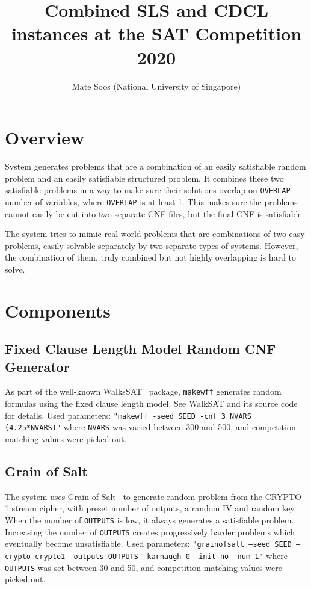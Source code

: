 \documentclass[final]{ieee}
\begin{document}
\title{Combined SLS and CDCL instances at the SAT Competition 2020}
\author{Mate Soos (National University of Singapore)}

\maketitle
\thispagestyle{empty}
\pagestyle{empty}



\section{Overview}
System generates problems that are a combination of an easily satisfiable random problem and an easily satisfiable structured problem. It combines these two satisfiable problems in a way to make sure their solutions overlap on \texttt{OVERLAP} number of variables, where \texttt{OVERLAP} is at least 1. This makes sure the problems cannot easily be cut into two separate CNF files, but the final CNF is satisfiable.

The system tries to mimic real-world problems that are combinations of two easy problems, easily solvable separately by two separate types of systems. However, the combination of them, truly combined but not highly overlapping is hard to solve.


\section{Components}


\subsection{Fixed Clause Length Model Random CNF Generator}

As part of the well-known WalksSAT~\cite{Selman95localsearch} package, \texttt{makewff} generates random formulas using the fixed clause length model. See WalkSAT and its source code for details. Used parameters: \texttt{"makewff -seed SEED -cnf 3 NVARS (4.25*NVARS)"} where \texttt{NVARS} was varied between 300 and 500, and competition-matching values were picked out.

\subsection{Grain of Salt}
The system uses Grain of Salt~\cite{soos2010grain} to generate random problem from the CRYPTO-1 stream cipher, with preset number of outputs, a random IV and random key. When the number of \texttt{OUTPUTS} is low, it always generates a satisfiable problem. Increasing the number of \texttt{OUTPUTS} creates progressively harder problems which eventually become unsatisfiable. Used parameters: \texttt{"grainofsalt --seed SEED --crypto crypto1 --outputs OUTPUTS --karnaugh 0 --init no --num 1"} where \texttt{OUTPUTS} was set between 30 and 50, and competition-matching values were picked out.
\end{document}
